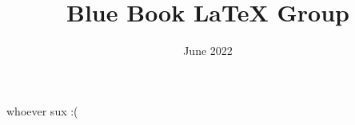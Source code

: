 \documentclass[oneside]{amsbook}
\title{Blue Book LaTeX Group}
\author{}
\date{June 2022}
\begin{document}
\maketitle
\tableofcontents

whoever sux :(






\printindex
\end{document}

